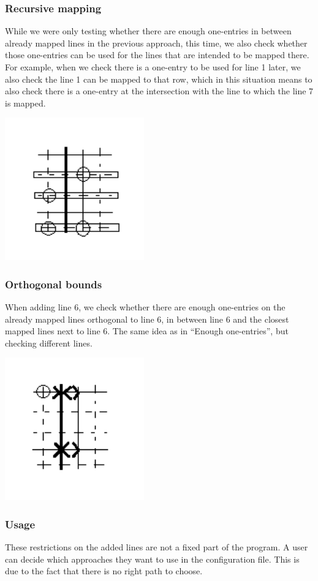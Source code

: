 \subsubsection{Recursive mapping}
While we were only testing whether there are enough one-entries in between already mapped lines in the previous approach, this time, we also check whether those one-entries can be used for the lines that are intended to be mapped there. For example, when we check there is a one-entry to be used for line 1 later, we also check the line 1 can be mapped to that row, which in this situation means to also check there is a one-entry at the intersection with the line to which the line 7 is mapped.

\centerline{\mbox{\includegraphics[width=60mm]{../img/recursive.png}}}
\subsubsection{Orthogonal bounds}
When adding line 6, we check whether there are enough one-entries on the already mapped lines orthogonal to line 6, in between line 6 and the closest mapped lines next to line 6. The same idea as in ``Enough one-entries'', but checking different lines.

\centerline{\mbox{\includegraphics[width=60mm]{../img/orthogonal.png}}}
\subsubsection{Usage}
These restrictions on the added lines are not a fixed part of the program. A user can decide which approaches they want to use in the configuration file. This is due to the fact that there is no right path to choose.

